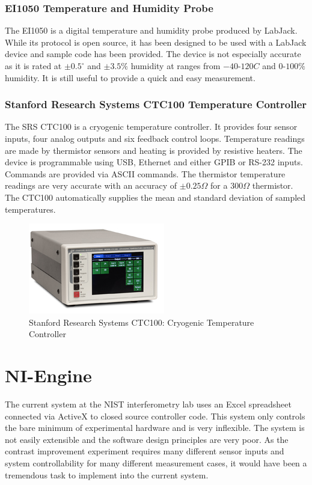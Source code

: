 \subsubsection{EI1050 Temperature and Humidity Probe}
The EI1050 is a digital temperature and humidity probe produced by LabJack. While its protocol is open source, it has been designed to be used with a LabJack device and sample code has been provided. The device is not especially accurate as it is rated at $\pm0.5^{\circ}$ and $\pm3.5\%$ humidity at ranges from $-40$-$120C$ and $0$-$100\%$ humidity. It is still useful to provide a quick and easy measurement. 
\subsubsection{Stanford Research Systems CTC100 Temperature Controller}
The SRS CTC100 is a cryogenic temperature controller. It provides four sensor inputs, four analog outputs and six feedback control loops. Temperature readings are made by thermistor sensors and heating is provided by resistive heaters. The device is programmable using USB, Ethernet and either GPIB or RS-232 inputs. Commands are provided via ASCII commands.  
The thermistor temperature readings are very accurate with an accuracy of $\pm0.25\Omega$ for a $300\Omega$ thermistor. The CTC100 automatically supplies the mean and standard deviation of sampled temperatures. 
\begin{figure}[ht!]
\centering
\includegraphics[scale=1.0]{Figures/ctc100.jpg}
\caption{Stanford Research Systems CTC100: Cryogenic Temperature Controller}
\label{fig:ctc100}
\end{figure}
\section{NI-Engine}
The current system at the NIST interferometry lab uses an Excel spreadsheet connected via ActiveX to closed source controller code. This system only controls the bare minimum of experimental hardware and is very inflexible. The system is not easily extensible and the software design principles are very poor. As the contrast improvement experiment requires many different sensor inputs and system controllability for many different measurement cases, it would have been a tremendous task to implement into the current system. 


